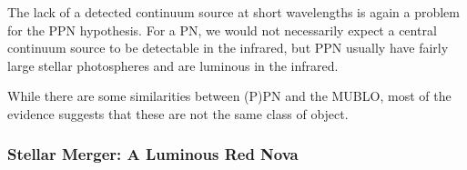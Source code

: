 \documentclass[]{aastex631}
\newcommand{\msun}{\ensuremath{\mathrm{M}_\odot}\xspace}
\newcommand{\kms}{\ensuremath{\mathrm{km~s}^{-1}}\xspace}
\begin{document}

The lack of a detected continuum source at short wavelengths is again a problem for the PPN hypothesis.
For a PN, we would not necessarily expect a central continuum source to be detectable in the infrared, but PPN usually have fairly large stellar photospheres and are luminous in the infrared.

While there are some similarities between (P)PN and the MUBLO, most of the evidence suggests that these are not the same class of object.






\subsubsection{Stellar Merger: A Luminous Red Nova}
\label{sec:merger}
\end{document}
